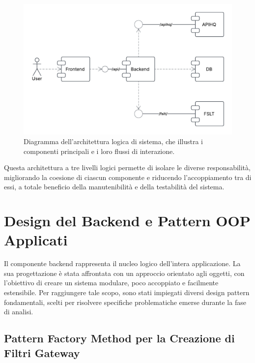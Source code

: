 \documentclass[12pt,a4paper,openright,twoside]{book}
\begin{document}
\vspace{1cm} %

\begin{figure}[h!]
    \centering
    \includegraphics[width=\textwidth]{figures/components.pdf}
    \caption{Diagramma dell'architettura logica di sistema, che illustra i componenti principali e i loro flussi di interazione.}
    \label{fig:logical_architecture_diagram}
\end{figure}

\vspace{1cm} %

Questa architettura a tre livelli logici permette di isolare le diverse responsabilità, migliorando la coesione di ciascun componente e riducendo l'accoppiamento tra di essi, a totale beneficio della manutenibilità e della testabilità del sistema.
\section{Design del Backend e Pattern OOP Applicati}
\label{sec:design_backend_oop}

Il componente backend rappresenta il nucleo logico dell'intera applicazione. La sua progettazione è stata affrontata con un approccio orientato agli oggetti, con l'obiettivo di creare un sistema modulare, poco accoppiato e facilmente estensibile. Per raggiungere tale scopo, sono stati impiegati diversi design pattern fondamentali, scelti per risolvere specifiche problematiche emerse durante la fase di analisi.

\subsection{Pattern Factory Method per la Creazione di Filtri Gateway}
\label{subsec:design_factory}
\end{document}
